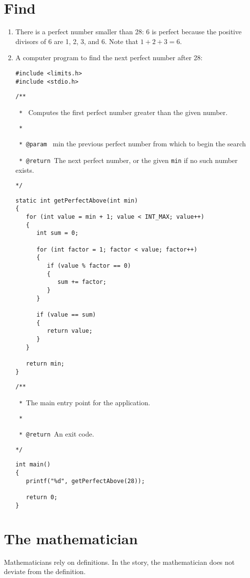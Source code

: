 \documentclass[12pt]{article}
\begin{document}
\section{Find}
\begin{enumerate}
    \item There is a perfect number smaller than 28: 6 is perfect because the positive divisors of 6 are 1, 2, 3, and 6. Note that $1+2+3=6$.
    \item A computer program to find the next perfect number after 28:
\begin{verbatim}
#include <limits.h>
#include <stdio.h>
\end{verbatim}

\verb|/**|

\verb| * | Computes the first perfect number greater than the given number.

\verb| * |

\verb| * @param | min the previous perfect number from which to begin the search

\verb| * @return |The next perfect number, or the given \verb|min| if no such number exists.

\verb|*/|
\begin{verbatim}
static int getPerfectAbove(int min)
{
   for (int value = min + 1; value < INT_MAX; value++)
   {
      int sum = 0;

      for (int factor = 1; factor < value; factor++)
      {
         if (value % factor == 0)
         {
            sum += factor;   
         }
      }
        
      if (value == sum)
      {
         return value;
      }
   }

   return min;
}
\end{verbatim}

\verb|/**|

\verb| * |The main entry point for the application.

\verb| * |

\verb| * @return |An exit code.

\verb|*/|

\begin{verbatim}
int main()
{
   printf("%d", getPerfectAbove(28));

   return 0;
}
\end{verbatim}
\end{enumerate}
\section{The mathematician}
Mathematicians rely on definitions. In the story, the mathematician does not deviate from the definition.
\end{document}
